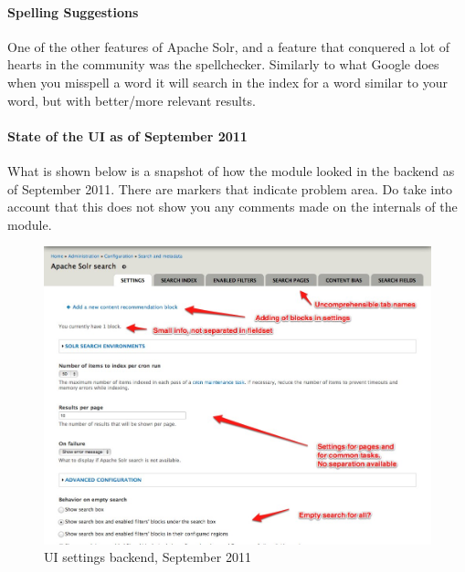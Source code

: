 \paragraph{Spelling Suggestions}
One of the other features of Apache Solr, and a feature that conquered a lot of hearts in the community was the spellchecker. Similarly to what Google does when you misspell a word it will search in the index for a word similar to your word, but with better/more relevant results.

\paragraph{State of the UI as of September 2011} What is shown below is a snapshot of how the module looked in the backend as of September 2011. There are markers that indicate problem area. Do take into account that this does not show you any comments made on the internals of the module.
\begin{figure}[H]
     \includegraphics[width=\textwidth]{images/apachesolr_ui_backend_september_2011_1.jpg}
     \caption{UI settings backend, September 2011}
\end{figure}

